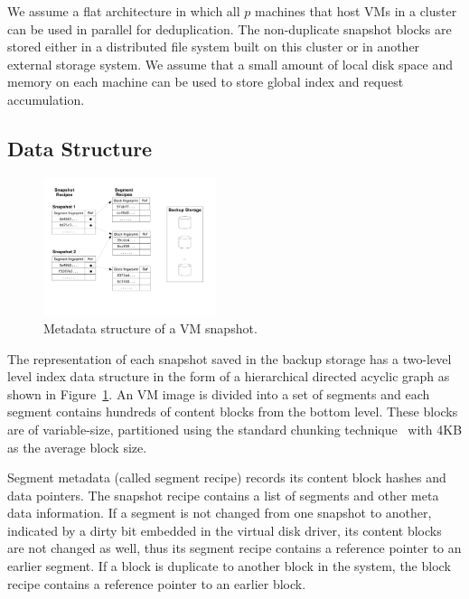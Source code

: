We assume a flat architecture in which  all $p$ machines that host VMs in a cluster can 
be used in parallel for deduplication. 
The non-duplicate snapshot blocks are stored either in a distributed file system built on
this cluster  or in another  external storage system. 
We assume that  a small amount of local disk space and memory on each machine can be used 
to store global index and request accumulation.


\subsection{Data Structure}

\begin{figure}
\centering
\includegraphics[width=0.45\textwidth]{snapshotdata.pdf}
\caption{ Metadata structure of a VM snapshot.}
\label{fig:snapshot}
\end{figure}

The representation of each snapshot saved in the backup storage
has a two-level level index data structure in the form of a hierarchical
directed acyclic graph as shown in Figure~\ref{fig:snapshot}.
An VM image is divided into a set of segments and each  segment contains hundreds of content blocks from the bottom level.
These blocks are of variable-size, partitioned using
the standard chunking technique~\cite{similar94} with 4KB as the average block size. 

Segment metadata (called segment recipe) records its  content block hashes and data pointers. 
The snapshot recipe contains a list of segments and other meta data information.
If a segment is not changed from one snapshot to another, indicated by a dirty bit embedded in the virtual disk driver, 
its content blocks are not changed as well, thus its segment recipe contains a reference pointer to an earlier segment.
If a block is duplicate to another block in the system,  the block recipe contains a reference pointer to an earlier block.


